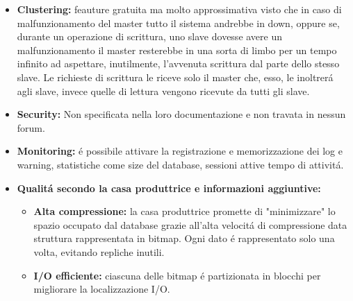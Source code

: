 \begin{itemize}
\item\textbf{Clustering:} feauture gratuita ma molto approssimativa visto che in caso di malfunzionamento del master tutto il sistema andrebbe in down, oppure se, durante un operazione di scrittura, uno slave dovesse avere un malfunzionamento il master resterebbe in una sorta di limbo per un tempo infinito ad aspettare, inutilmente, l'avvenuta scrittura dal parte dello stesso slave. Le richieste di scrittura le riceve solo il master che, esso, le inoltrer\'a agli slave, invece quelle di lettura vengono ricevute da tutti gli slave.
\item\textbf{Security:} Non specificata nella loro documentazione e non travata in nessun forum.
\item\textbf{Monitoring:} \'e possibile attivare la registrazione e memorizzazione dei log e warning, statistiche come size del database, sessioni attive tempo di attivit\'a.
\item\textbf{Qualit\'a secondo la casa produttrice e informazioni aggiuntive:} 
\begin{itemize}
\item\textbf{Alta compressione:} la casa produttrice promette di "minimizzare" lo spazio occupato dal database grazie all'alta velocit\'a di compressione data struttura rappresentata in bitmap. Ogni dato \'e rappresentato solo una volta, evitando repliche inutili.
\item\textbf{I/O efficiente:} ciascuna delle bitmap \'e partizionata in blocchi per migliorare la localizzazione I/O.
\end{itemize}
\end{itemize}
\newpage



